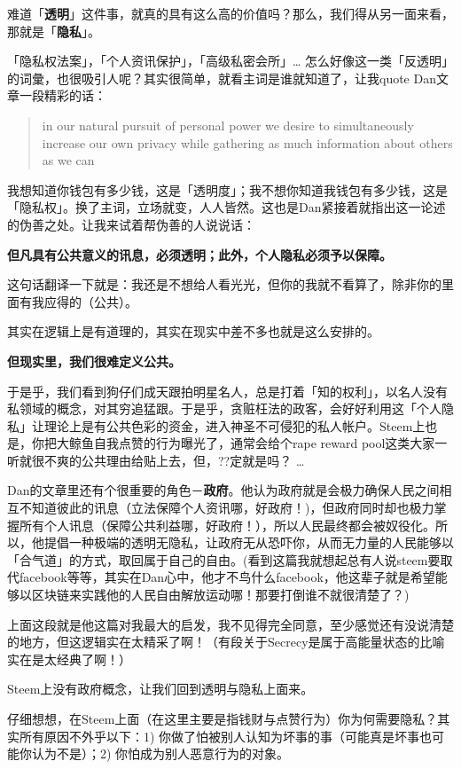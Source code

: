 \documentclass[]{ctexbook}
\begin{document}
难道「\textbf{透明}」这件事，就真的具有这么高的价值吗？那么，我们得从另一面来看，那就是「\textbf{隐私}」。

「隐私权法案」，「个人资讯保护」，「高级私密会所」\ldots{} 怎么好像这一类「反透明」的词彙，也很吸引人呢？其实很简单，就看主词是谁就知道了，让我quote Dan文章一段精彩的话：

\begin{quote}
in our natural pursuit of personal power we desire to simultaneously increase our own privacy while gathering as much information about others as we can
\end{quote}

我想知道你钱包有多少钱，这是「透明度」；我不想你知道我钱包有多少钱，这是「隐私权」。换了主词，立场就变，人人皆然。这也是Dan紧接着就指出这一论述的伪善之处。让我来试着帮伪善的人说说话：

\textbf{但凡具有公共意义的讯息，必须透明；此外，个人隐私必须予以保障。}

这句话翻译一下就是：我还是不想给人看光光，但你的我就不看算了，除非你的里面有我应得的（公共）。

其实在逻辑上是有道理的，其实在现实中差不多也就是这么安排的。

\textbf{但现实里，我们很难定义公共。}

于是乎，我们看到狗仔们成天跟拍明星名人，总是打着「知的权利」，以名人没有私领域的概念，对其穷追猛跟。于是乎，贪赃枉法的政客，会好好利用这「个人隐私」让理论上是有公共色彩的资金，进入神圣不可侵犯的私人帐户。Steem上也是，你把大鲸鱼自我点赞的行为曝光了，通常会给个rape reward pool这类大家一听就很不爽的公共理由给贴上去，但，??定就是吗？ \ldots{}

Dan的文章里还有个很重要的角色－\textbf{政府}。他认为政府就是会极力确保人民之间相互不知道彼此的讯息（立法保障个人资讯哪，好政府！)，但政府同时却也极力掌握所有个人讯息（保障公共利益哪，好政府！），所以人民最终都会被奴役化。所以，他提倡一种极端的透明无隐私，让政府无从恐吓你，从而无力量的人民能够以「合气道」的方式，取回属于自己的自由。(看到这篇我就想起总有人说steem要取代facebook等等，其实在Dan心中，他才不鸟什么facebook，他这辈子就是希望能够以区块链来实践他的人民自由解放运动哪！那要打倒谁不就很清楚了？)

上面这段就是他这篇对我最大的启发，我不见得完全同意，至少感觉还有没说清楚的地方，但这逻辑实在太精采了啊！（有段关于Secrecy是属于高能量状态的比喻实在是太经典了啊！）

Steem上没有政府概念，让我们回到透明与隐私上面来。

仔细想想，在Steem上面（在这里主要是指钱财与点赞行为）你为何需要隐私？其实所有原因不外乎以下：1) 你做了怕被别人认知为坏事的事（可能真是坏事也可能你认为不是）；2) 你怕成为别人恶意行为的对象。
\end{document}
